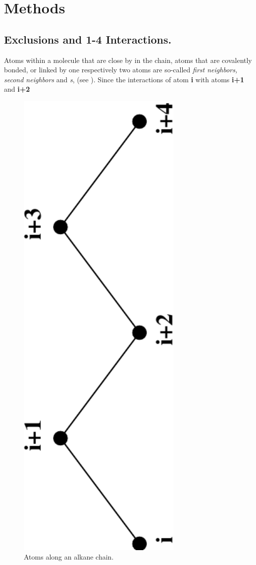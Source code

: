 \section{Methods}
\subsection{Exclusions and 1-4 Interactions.}
Atoms within a molecule that are close by in the chain, 
{\ie} atoms that are covalently bonded, or linked by one respectively two
atoms are so-called {\em first neighbors, second neighbors} and 
{\em {}s}, (see ). Since the
interactions of atom {\bf i} with atoms {\bf i+1} and {\bf i+2} 

\begin{figure}
\centerline{\includegraphics[angle=270,width=8cm]{plots/chain}}
\caption{Atoms along an alkane chain.}
\label{fig:chain}
\end{figure}

